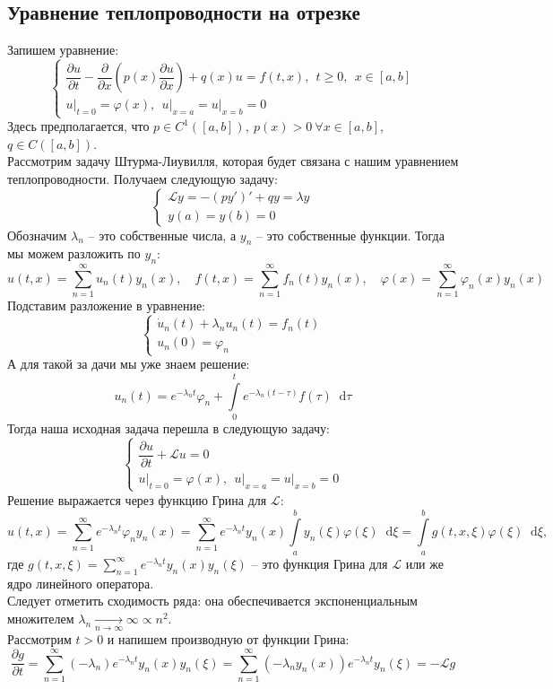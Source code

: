 \documentclass[11pt,a4paper]{report}
\numberwithin{equation}{section}
\numberwithin{figure}{chapter}
\numberwithin{table}{chapter}
\newcommand{\LL}{\mathscr{L}}
\newcommand{\p}{\partial}
\newcommand{\dd}{\mathop{}\!\mathrm{d}}
\newcommand{\skobka}[1]{\left( #1 \right)}
\newcommand{\SUMN}{\sum\limits_{n=1}^{\infty}}
\renewcommand{\phi}{\varphi}
\begin{document}
\subsection{Уравнение теплопроводности на отрезке}
Запишем уравнение:
\[\begin{cases}
    \dfrac{\p u}{\p t} - \dfrac{\p}{\p x}\skobka{p(x)\dfrac{\p u}{\p x}} + q(x)u = f(t,x), \ \ t\geq0, \ \ x\in[a,b]\\
    u\Big|_{t=0} = \phi(x), \ \ u\Big|_{x=a} = u\Big|_{x = b} = 0
\end{cases}\]
Здесь предполагается, что $p\in C^1([a,b]), \ p(x)>0 \ \forall x\in[a,b]$, $q\in C([a,b])$.\\
Рассмотрим задачу Штурма-Лиувилля, которая будет связана с нашим уравнением теплопроводности. Получаем следующую задачу:
\[
\begin{cases}
    \LL y=-(py')' + qy = \lambda y\\
    y(a) = y(b) = 0
\end{cases}
\]
Обозначим $\lambda_n$ -- это собственные числа, а $y_n$ -- это собственные функции. Тогда мы можем разложить по $y_n$:
\[
u(t,x) = \SUMN u_n(t)y_n(x), \quad f(t,x) = \SUMN f_n(t)y_n(x), \quad \phi(x) = \SUMN \phi_n(x)y_n(x)
\]Подставим разложение в уравнение:
\[
\begin{cases}
    \dot{u}_n(t) + \lambda_n u_n(t) = f_n(t)\\
    u_n(0) = \phi_n
\end{cases}
\] А для такой за   дачи мы уже знаем решение:
\[u_n(t)=e^{-\lambda_n t}\phi_n + \int\limits_{0}^{t}e^{-\lambda_n (t-\tau)}f(\tau)\dd \tau\]
Тогда наша исходная задача перешла в следующую задачу:
\[\begin{cases}
    \dfrac{\p u}{\p t} +\LL u= 0\\
    u\Big|_{t=0} = \phi(x), \ \ u\Big|_{x=a} = u\Big|_{x = b} = 0
\end{cases}\] Решение выражается через функцию Грина для $\LL$:
\[
u(t,x) = \SUMN e^{-\lambda_n t}\phi_ny_n(x) = \SUMN e^{-\lambda_n t}y_n(x)\int\limits_{a}^{b}y_n(\xi)\phi(\xi)\dd \xi = \int\limits_{a}^{b}g(t,x,\xi)\phi(\xi)\dd \xi,
\]
где $g(t,x,\xi) = \SUMN e^{-\lambda_n t}y_n(x)y_n(\xi)$ -- это функция Грина для $\LL$ или же ядро линейного оператора.\\
Следует отметить сходимость ряда: она обеспечивается экспоненциальным множителем $\lambda_n\xrightarrow[n\to\infty]{}\infty\propto  n^2$.\\
Рассмотрим $t>0$ и напишем производную от функции Грина:
\[
\dfrac{\p g}{\p t}  = \SUMN\skobka{-\lambda_n}e^{-\lambda_nt}y_n(x)y_n(\xi) =\SUMN\skobka{-\lambda_ny_n(x)}e^{-\lambda_nt}y_n(\xi) = -\LL g
\]
\end{document}
